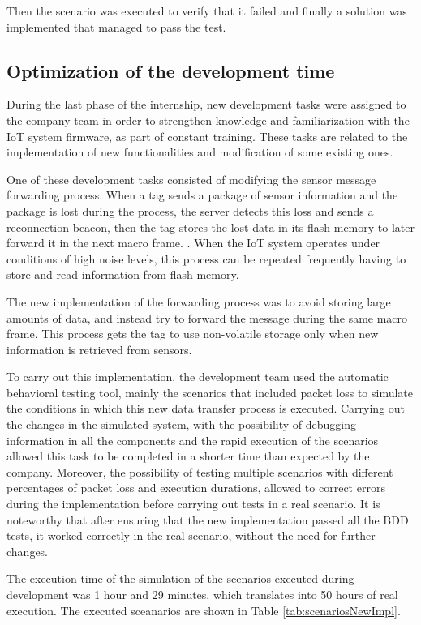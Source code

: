 \documentclass[journal]{IEEEtran}	%
\begin{document}
Then the scenario was executed to verify that it failed and finally a solution was implemented that managed to pass the test.

\subsection{Optimization of the development time}

During the last phase of the internship, new development tasks were assigned to the company team in order to strengthen knowledge and familiarization with the IoT system firmware, as part of constant training. These tasks are related to the implementation of new functionalities and modification of some existing ones.

One of these development tasks consisted of modifying the sensor message forwarding process. When a tag sends a package of sensor information and the package is lost during the process, the server detects this loss and sends a reconnection beacon, then the tag stores the lost data in its flash memory to later forward it in the next macro frame. . When the IoT system operates under conditions of high noise levels, this process can be repeated frequently having to store and read information from flash memory.

The new implementation of the forwarding process was to avoid storing large amounts of data, and instead try to forward the message during the same macro frame. This process gets the tag to use non-volatile storage only when new information is retrieved from sensors.

To carry out this implementation, the development team used the automatic behavioral testing tool, mainly the scenarios that included packet loss to simulate the conditions in which this new data transfer process is executed. Carrying out the changes in the simulated system, with the possibility of debugging information in all the components and the rapid execution of the scenarios allowed this task to be completed in a shorter time than expected by the company. Moreover, the possibility of testing multiple scenarios with different percentages of packet loss and execution durations, allowed to correct errors during the implementation before carrying out tests in a real scenario. It is noteworthy that after ensuring that the new implementation passed all the BDD tests, it worked correctly in the real scenario, without the need for further changes.

The execution time of the simulation of the scenarios executed during development was 1 hour and 29 minutes, which translates into 50 hours of real execution. The executed sceanarios are shown in Table \ref{tab:scenariosNewImpl}.
\end{document}
